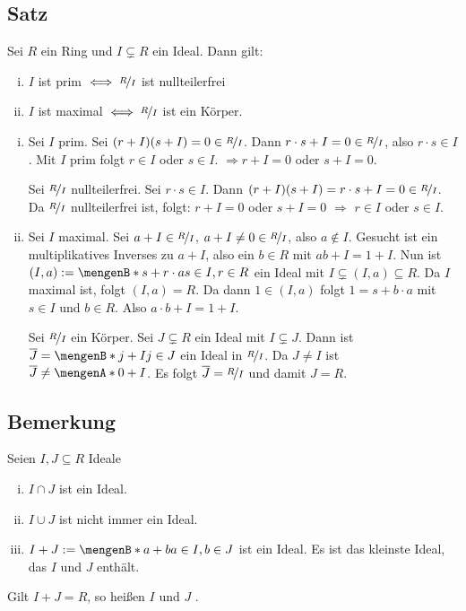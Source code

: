 \subsection[Satz: Zentrale Eigenschaften von maximalen und Primidealen]{Satz} %
\label{sub:615}
Sei $R$ ein Ring und $I \subsetneq R$ ein Ideal. Dann gilt:
\begin{enumerate}[(i)]
	\item $I$ ist prim $\iff \nicefrac{R}{I}$ ist nullteilerfrei
	\item $I$ ist maximal $\iff \nicefrac{R}{I}$ ist ein Körper.
\end{enumerate}
\begin{enumerate}[(i)]
	\item Sei $I$ prim. Sei $(r+I)(s+I)= 0  \in \nicefrac{R}{I}$. Dann $r \cdot s + I = 0 \in \nicefrac{R}{I}$, also $r \cdot s \in I$. Mit $I$ prim folgt $r \in I$ oder 
	$s \in I$. $\Rightarrow r+I=0$ oder $s+I=0$.
	
	Sei $\nicefrac{R}{I}$ nullteilerfrei. Sei $r \cdot s  \in I$. Dann $(r+I)(s+I)= r \cdot s +I = 0 \in \nicefrac{R}{I}$. Da $\nicefrac{R}{I}$ nullteilerfrei ist, folgt:
	$r+I=0$ oder $s+I =0$ $\Rightarrow $ $r \in I$ oder $s \in I$. \bewende
	\item Sei $I$ maximal. Sei $a+I \in \nicefrac{R}{I}$, $a +I \not= 0 \in \nicefrac{R}{I}$, also $a \not\in I$. Gesucht ist ein multiplikatives Inverses zu $a+I$, also
	ein $b \in R$ mit $ab +I = 1+I$. Nun ist $(I,a) := \set[s+r \cdot a]{s \in I, r \in R} $ ein Ideal mit $I \subsetneq (I,a) \subseteq R$. Da $I$ maximal ist, folgt
	$(I,a)= R$. Da dann $1 \in (I,a)$ folgt $1= s+ b \cdot a$ mit $s \in I$ und $b \in R$. Also $a \cdot b +I = 1 +I$.
	
	Sei $\nicefrac{R}{I}$ ein Körper. Sei $J \subsetneq R$ ein Ideal mit $I \subsetneq J$. Dann ist $\overline{J} = \set[j+I]{j \in J}  $ ein Ideal in $\nicefrac{R}{I}$.
	Da $J \not= I$ ist $\overline{J} \not= \set{0+I}  $. Es folgt $\overline{J} = \nicefrac{R}{I}$ und damit $J=R$. \bewende
\end{enumerate}

\subsection[Bemerkung: Mengenoperationen mit Idealen und koprime Ideale]{Bemerkung} %
\label{sub:616}
Seien $I,J \subseteq R$ Ideale
\begin{enumerate}[(i)]
	\item $I \cap J$ ist ein Ideal.
	\item $I \cup J$ ist nicht immer ein Ideal.
	\item $I+J := \set[a+b]{a \in I, b \in J}$ ist ein Ideal. Es ist das kleinste Ideal, das $I$ und $J$ enthält.
\end{enumerate}
Gilt $I+J = R$, so heißen $I$ und $J$ . 


